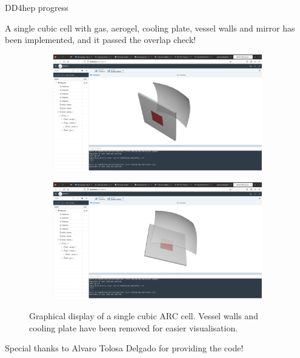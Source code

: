 \documentclass{beamer}
\begin{document}
\begin{frame}{DD4hep progress}
  \begin{center}
    \large A single cubic cell with gas, aerogel, cooling plate, vessel walls and mirror has been implemented, and it passed the overlap check!
  \end{center}
  \begin{figure}
    \centering
    \begin{subfigure}{0.4\textwidth}
      \includegraphics[width = 1.0\textwidth,trim={25cm 9cm 20cm 8cm},clip=true]{Plots/ARC_Screenshot1.png}
    \end{subfigure}%
    \begin{subfigure}{0.4\textwidth}
      \includegraphics[width = 1.0\textwidth,trim={25cm 9cm 20cm 8cm},clip=true]{Plots/ARC_Screenshot2.png}
    \end{subfigure}%
    \caption{Graphical display of a single cubic ARC cell. Vessel walls and cooling plate have been removed for easier visualisation.}
  \end{figure}
  \begin{center}
    \large Special thanks to Alvaro Tolosa Delgado for providing the code!
  \end{center}
\end{frame}
\end{document}
